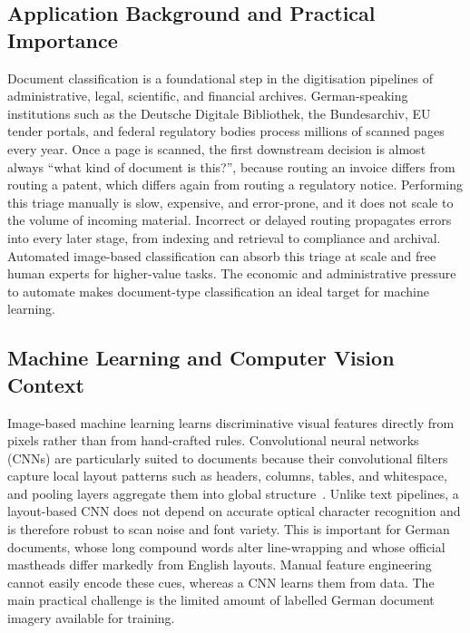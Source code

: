 \documentclass[preprint,12pt]{elsarticle}
\begin{document}
\subsection{Application Background and Practical Importance}
Document classification is a foundational step in the digitisation pipelines of
administrative, legal, scientific, and financial archives.
German-speaking institutions such as the Deutsche Digitale Bibliothek, the
Bundesarchiv, EU tender portals, and federal regulatory bodies process millions
of scanned pages every year.
Once a page is scanned, the first downstream decision is almost always
``what kind of document is this?'', because routing an invoice differs from
routing a patent, which differs again from routing a regulatory notice.
Performing this triage manually is slow, expensive, and error-prone, and it does
not scale to the volume of incoming material.
Incorrect or delayed routing propagates errors into every later stage, from
indexing and retrieval to compliance and archival.
Automated image-based classification can absorb this triage at scale and free
human experts for higher-value tasks.
The economic and administrative pressure to automate makes document-type
classification an ideal target for machine learning.

\subsection{Machine Learning and Computer Vision Context}
Image-based machine learning learns discriminative visual features directly from
pixels rather than from hand-crafted rules.
Convolutional neural networks (CNNs) are particularly suited to documents
because their convolutional filters capture local layout patterns such as
headers, columns, tables, and whitespace, and pooling layers aggregate them into
global structure~\cite{he2016deep}.
Unlike text pipelines, a layout-based CNN does not depend on accurate optical
character recognition and is therefore robust to scan noise and font variety.
This is important for German documents, whose long compound words alter
line-wrapping and whose official mastheads differ markedly from English layouts.
Manual feature engineering cannot easily encode these cues, whereas a CNN learns
them from data.
The main practical challenge is the limited amount of labelled German document
imagery available for training.
\end{document}
